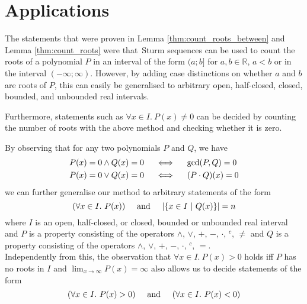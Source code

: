 \documentclass[11pt,a4paper,oneside]{article}
\newcommand{\RR}{\mathbb{R}}
\begin{document}
\newpage
\section{Applications}
\label{sec:applications}

The statements that were proven in Lemma \ref{thm:count_roots_between} and Lemma \ref{thm:count_roots} were that\ Sturm se\-quen\-ces can be used to count the roots of a polynomial $P$ in an interval of the form $(a;b]$ for $a,b\in\RR$, $a < b$ or in the interval $(-\infty;\infty)$. However, by adding case distinctions on whether $a$ and $b$ are roots of $P$, this can easily be generalised to arbitrary open, half-closed, closed, bounded, and unbounded real intervals.

Furthermore, statements such as $\forall x \in I.\ P(x) \neq 0$ can be decided by counting the number of roots with the above method and checking whether it is zero.

By observing that for any two polynomials $P$ and $Q$, we have 
\begin{align*}
P(x) = 0 \wedge Q(x) = 0\hskip5mm&\Longleftrightarrow\hskip5mm \gcd(P,Q) = 0\\
P(x) = 0 \vee Q(x) = 0\hskip5mm&\Longleftrightarrow\hskip5mm (P\cdot Q)(x) = 0
\end{align*}
we can further generalise our method to arbitrary statements of the form
$$(\forall x \in I.\ P(x))\hskip5mm\mathrm{and}\hskip5mm |\{x\in I\ |\ Q(x)\}| = n$$
where $I$ is an open, half-closed, or closed, bounded or unbounded real interval and $P$ is a property consisting of the operators $\wedge$, $\vee$, $+$, $-$, $\cdot$, $^c$, $\neq$ and $Q$ is a property consisting of the operators $\wedge$, $\vee$, $+$, $-$, $\cdot$, $^c$, $=$.\\

Independently from this, the observation that $\forall x\in I.\ P(x)>0$ holds iff $P$ has no roots in $I$ and $\lim_{x\to\infty} P(x) = \infty$ also allows us to decide statements of the form
$$(\forall x\in I.\ P(x) > 0)\hskip5mm\mathrm{and}\hskip5mm(\forall x\in I.\ P(x) < 0)$$\vskip5mm
\end{document}
